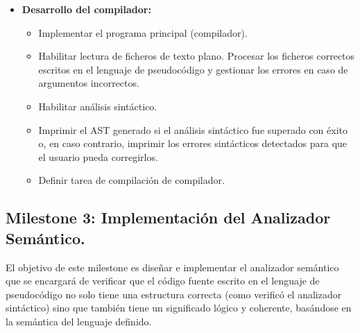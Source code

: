 \begin{itemize}
    \item \textbf{Desarrollo del compilador:}
    \begin{itemize}
        \item Implementar el programa principal (compilador).
        \item Habilitar lectura de ficheros de texto plano. Procesar los ficheros correctos escritos en el lenguaje de pseudocódigo y gestionar los errores en caso de argumentos incorrectos.
        \item Habilitar análisis sintáctico.
        \item Imprimir el AST generado si el análisis sintáctico fue superado con éxito o, en caso contrario, imprimir los errores sintácticos detectados para que el usuario pueda corregirlos.
        \item Definir tarea de compilación de compilador.
    \end{itemize}
\end{itemize}

\subsection{Milestone 3: Implementación del Analizador Semántico.}
El objetivo de este milestone es diseñar e implementar el analizador semántico que se encargará de verificar que el código fuente escrito en el lenguaje de pseudocódigo no solo tiene una estructura correcta (como verificó el analizador sintáctico) sino que también tiene un significado lógico y coherente, basándose en la semántica del lenguaje definido.

